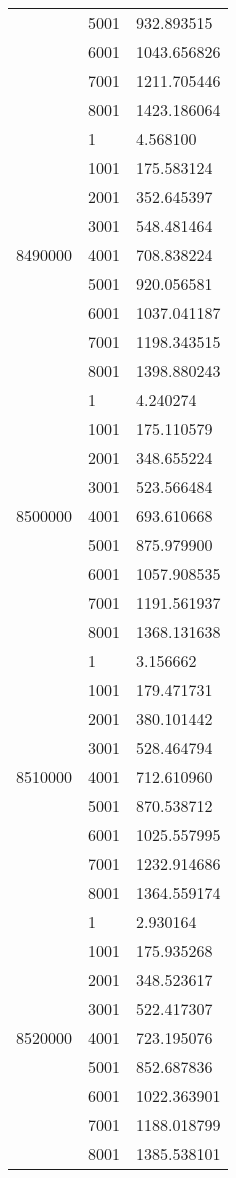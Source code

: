 \begin{table}[htb!]
\begin{tabular}{lll}
 & 5001 & 932.893515 \\
 & 6001 & 1043.656826 \\
 & 7001 & 1211.705446 \\
 & 8001 & 1423.186064 \\
\multirow[c]{9}{*}{8490000} & 1 & 4.568100 \\
 & 1001 & 175.583124 \\
 & 2001 & 352.645397 \\
 & 3001 & 548.481464 \\
 & 4001 & 708.838224 \\
 & 5001 & 920.056581 \\
 & 6001 & 1037.041187 \\
 & 7001 & 1198.343515 \\
 & 8001 & 1398.880243 \\
\multirow[c]{9}{*}{8500000} & 1 & 4.240274 \\
 & 1001 & 175.110579 \\
 & 2001 & 348.655224 \\
 & 3001 & 523.566484 \\
 & 4001 & 693.610668 \\
 & 5001 & 875.979900 \\
 & 6001 & 1057.908535 \\
 & 7001 & 1191.561937 \\
 & 8001 & 1368.131638 \\
\multirow[c]{9}{*}{8510000} & 1 & 3.156662 \\
 & 1001 & 179.471731 \\
 & 2001 & 380.101442 \\
 & 3001 & 528.464794 \\
 & 4001 & 712.610960 \\
 & 5001 & 870.538712 \\
 & 6001 & 1025.557995 \\
 & 7001 & 1232.914686 \\
 & 8001 & 1364.559174 \\
\multirow[c]{9}{*}{8520000} & 1 & 2.930164 \\
 & 1001 & 175.935268 \\
 & 2001 & 348.523617 \\
 & 3001 & 522.417307 \\
 & 4001 & 723.195076 \\
 & 5001 & 852.687836 \\
 & 6001 & 1022.363901 \\
 & 7001 & 1188.018799 \\
 & 8001 & 1385.538101 \\

\end{tabular}
\end{table}
